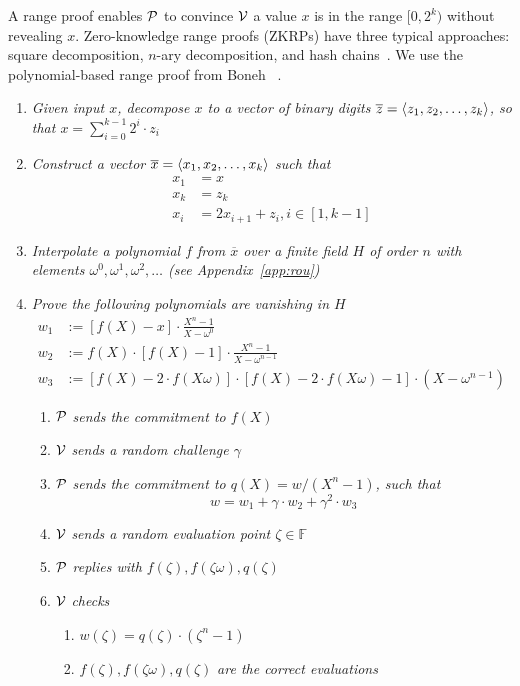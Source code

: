 A range proof enables $\mathcal{P}$ to convince $\mathcal{V}$ a value $x$ is in the range $[0,2^k)$ without revealing $x$. Zero-knowledge range proofs (ZKRPs) have three typical approaches: square decomposition, $n$-ary decomposition, and hash chains~\cite{zkrp}. We use the polynomial-based range proof from Boneh \etal~\cite{rangeproof}.
\begin{enumerate}
    \item \textit{Given input $x$, decompose $x$ to a vector of binary digits $\overline{z}=\left \langle z_1,z_2,\dots,z_k \right \rangle$, so that $x=\sum_{i=0}^{k-1}2^i\cdot{z_i}$} 
    \item \textit{Construct a vector $\overline{x}=\left \langle x_1,x_2,\dots,x_k \right \rangle$ such that}
    \begin{align*}
        x_1&=x \\
        x_k&=z_k \\
        x_i&=2x_{i+1}+z_i,i\in[1,k-1]
    \end{align*}
    \item \textit{Interpolate a polynomial $f$ from $\overline{x}$ over a finite field $H$ of order $n$ with elements $\omega^0,\omega^1,\omega^2,\ldots$ (see Appendix~\ref{app:rou})} 
    \item \textit{Prove the following polynomials are vanishing in $H$}
    \begin{align*}
        w_1&:=[f(X)-x]\cdot\frac{X^n-1}{X-\omega^0} \\
        w_2&:=f(X)\cdot[f(X)-1]\cdot\frac{X^n-1}{X-\omega^{n-1}} \\
        w_3&:=[f(X)-2\cdot{f(X\omega)}]\cdot[f(X)-2\cdot{f(X\omega)}-1]\cdot(X-\omega^{n-1})
    \end{align*}
    \begin{enumerate}
        \item $\mathcal{P}$ \textit{sends the commitment to $f(X)$}
        \item $\mathcal{V}$ \textit{sends a random challenge $\gamma$}
        \item $\mathcal{P}$ \textit{sends the commitment to $q(X)=w/(X^n-1)$, such that}
        \[ w=w_1+\gamma\cdot{w_2}+\gamma^2\cdot{w_3} \]
        \item $\mathcal{V}$ \textit{sends a random evaluation point $\zeta\in\mathbb{F}$}
        \item $\mathcal{P}$ \textit{replies with $f(\zeta),f(\zeta\omega),q(\zeta)$}
        \item $\mathcal{V}$ \textit{checks}
        \begin{enumerate}
            \item $w(\zeta)=q(\zeta)\cdot(\zeta^n-1)$
            \item $f(\zeta),f(\zeta\omega),q(\zeta)$ \textit{are the correct evaluations}
        \end{enumerate}
    \end{enumerate}
\end{enumerate}

